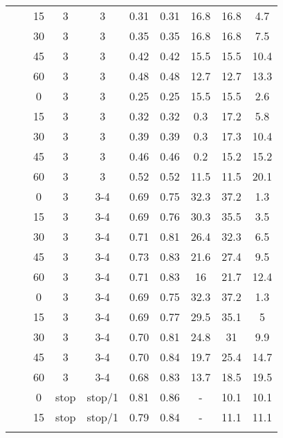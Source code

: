 \begin{longtable}[t]{cccccccccc}
	\nopagebreak
	&  & 15 & 3 & 3 & 0.31 & 0.31 & 16.8 & 16.8 & 4.7\\
	\nopagebreak
	&  & 30 & 3 & 3 & 0.35 & 0.35 & 16.8 & 16.8 & 7.5\\
	\nopagebreak
	&  & 45 & 3 & 3 & 0.42 & 0.42 & 15.5 & 15.5 & 10.4\\
	\nopagebreak
	& \multirow{-5}{*}{\centering\arraybackslash 0.2} & 60 & 3 & 3 & 0.48 & 0.48 & 12.7 & 12.7 & 13.3\\
	\nopagebreak
	&  & 0 & 3 & 3 & 0.25 & 0.25 & 15.5 & 15.5 & 2.6\\
	\nopagebreak
	&  & 15 & 3 & 3 & 0.32 & 0.32 & 0.3 & 17.2 & 5.8\\
	\nopagebreak
	&  & 30 & 3 & 3 & 0.39 & 0.39 & 0.3 & 17.3 & 10.4\\
	\nopagebreak
	&  & 45 & 3 & 3 & 0.46 & 0.46 & 0.2 & 15.2 & 15.2\\
	\nopagebreak
	\multirow{-10}{*}{\centering\arraybackslash 3} & \multirow{-5}{*}{\centering\arraybackslash 0.33} & 60 & 3 & 3 & 0.52 & 0.52 & 11.5 & 11.5 & 20.1\\
	\cmidrule{1-10}\pagebreak[0]
	&  & 0 & 3 & 3-4 & 0.69 & 0.75 & 32.3 & 37.2 & 1.3\\
	\nopagebreak
	&  & 15 & 3 & 3-4 & 0.69 & 0.76 & 30.3 & 35.5 & 3.5\\
	\nopagebreak
	&  & 30 & 3 & 3-4 & 0.71 & 0.81 & 26.4 & 32.3 & 6.5\\
	\nopagebreak
	&  & 45 & 3 & 3-4 & 0.73 & 0.83 & 21.6 & 27.4 & 9.5\\
	\nopagebreak
	& \multirow{-5}{*}{\centering\arraybackslash 0.2} & 60 & 3 & 3-4 & 0.71 & 0.83 & 16 & 21.7 & 12.4\\
	\nopagebreak
	&  & 0 & 3 & 3-4 & 0.69 & 0.75 & 32.3 & 37.2 & 1.3\\
	\nopagebreak
	&  & 15 & 3 & 3-4 & 0.69 & 0.77 & 29.5 & 35.1 & 5\\
	\nopagebreak
	&  & 30 & 3 & 3-4 & 0.70 & 0.81 & 24.8 & 31 & 9.9\\
	\nopagebreak
	&  & 45 & 3 & 3-4 & 0.70 & 0.84 & 19.7 & 25.4 & 14.7\\
	\nopagebreak
	\multirow{-10}{*}{\centering\arraybackslash 4} & \multirow{-5}{*}{\centering\arraybackslash 0.33} & 60 & 3 & 3-4 & 0.68 & 0.83 & 13.7 & 18.5 & 19.5\\
	\cmidrule{1-10}\pagebreak[0]
	&  & 0 & stop & stop/1 & 0.81 & 0.86 & - & 10.1 & 10.1\\
	\nopagebreak
	&  & 15 & stop & stop/1 & 0.79 & 0.84 & - & 11.1 & 11.1\\
	\nopagebreak

\end{longtable}
